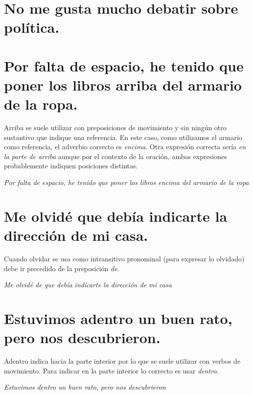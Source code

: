 \documentclass[12pt, a4paper, oneside]{report}
\begin{document}
        \section{No me gusta mucho debatir sobre política.}

        \section{Por falta de espacio, he tenido que poner los libros \color{rojo}arriba\color{negro} \;del
        armario de la ropa.}
        Arriba se suele utilizar con preposiciones de movimiento y sin ningún otro sustantivo que indique una
        referencia. En este caso, como utilizamos el armario como referencia, el adverbio correcto es
        \emph{encima}. Otra expresión correcta sería \emph{en la parte de arriba} aunque por el contexto de la
        oración, ambas expresiones probablemente indiquen posiciones distintas.
        \begin{center}
            \textit{Por falta de espacio, he tenido que poner los libros \color{verde}encima\color{negro}
            \;del armario de la ropa}
        \end{center}
        \clearpage

        \setcounter{chapter}{4}
        \setcounter{section}{0}

        \section{Me olvidé \color{rojo}que\color{negro} \;debía indicarte la dirección de mi casa.}
        Cuando olvidar se usa como intransitivo pronominal (para expresar lo olvidado) debe ir precedido de la
        preposición \emph{de}.
        \begin{center}
            \textit{Me olvidé \color{verde}de que\color{negro} \;debía indicarte la dirección de mi casa}
        \end{center}

        \section{Estuvimos \color{rojo}adentro\color{negro} \;un buen rato, pero nos descubrieron.}
        Adentro indica hacia la parte interior por lo que se suele utilizar con verbos de movimiento. Para
        indicar en la parte interior lo correcto es usar \emph{dentro}.
        \begin{center}
            \textit{Estuvimos \color{verde}dentro\color{negro} \;un buen rato, pero nos descubrieron}
        \end{center}
\end{document}

